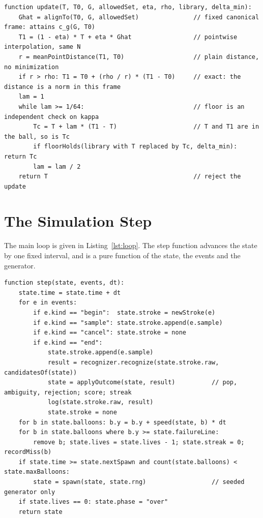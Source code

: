 \begin{lstlisting}[language=Pseudo,caption={Bounded template update (Chapter~\ref{ch:personalized-recognition}).},label={lst:update}]
function update(T, T0, G, allowedSet, eta, rho, library, delta_min):
    Ghat = alignTo(T0, G, allowedSet)               // fixed canonical frame: attains c_g(G, T0)
    T1 = (1 - eta) * T + eta * Ghat                 // pointwise interpolation, same N
    r = meanPointDistance(T1, T0)                   // plain distance, no minimization
    if r > rho: T1 = T0 + (rho / r) * (T1 - T0)     // exact: the distance is a norm in this frame
    lam = 1
    while lam >= 1/64:                              // floor is an independent check on kappa
        Tc = T + lam * (T1 - T)                     // T and T1 are in the ball, so is Tc
        if floorHolds(library with T replaced by Tc, delta_min): return Tc
        lam = lam / 2
    return T                                        // reject the update
\end{lstlisting}

\chapter{The Simulation Step}\label{app:loop}

The main loop is given in Listing~\ref{lst:loop}. The step function advances the state by one fixed interval, and is a pure function of the state, the events and the generator.

\begin{lstlisting}[language=Pseudo,caption={One simulation step.},label={lst:step}]
function step(state, events, dt):
    state.time = state.time + dt
    for e in events:
        if e.kind == "begin":  state.stroke = newStroke(e)
        if e.kind == "sample": state.stroke.append(e.sample)
        if e.kind == "cancel": state.stroke = none
        if e.kind == "end":
            state.stroke.append(e.sample)
            result = recognizer.recognize(state.stroke.raw, candidatesOf(state))
            state = applyOutcome(state, result)          // pop, ambiguity, rejection; score; streak
            log(state.stroke.raw, result)
            state.stroke = none
    for b in state.balloons: b.y = b.y + speed(state, b) * dt
    for b in state.balloons where b.y >= state.failureLine:
        remove b; state.lives = state.lives - 1; state.streak = 0; recordMiss(b)
    if state.time >= state.nextSpawn and count(state.balloons) < state.maxBalloons:
        state = spawn(state, state.rng)                  // seeded generator only
    if state.lives == 0: state.phase = "over"
    return state
\end{lstlisting}

